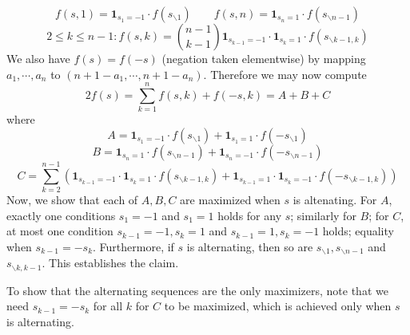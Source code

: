 \documentclass[11pt,a4paper]{article}
\begin{document}
\begin{enumerate}
		$$
		f(s, 1)=\boldsymbol{1}_{s_1=-1}\cdot f(s_{\backslash 1})
		\qquad 
		f(s, n)=\boldsymbol{1}_{s_n=1}\cdot f(s_{\backslash n-1})
		$$
		$$
		2\le k\le n-1: f(s, k) =  \binom{n-1}{k-1}\boldsymbol{1}_{s_{k-1}=-1}\cdot \boldsymbol{1}_{s_{k}=1}\cdot f(s_{\backslash k-1, k})
		$$
		We also have $f(s)=f(-s)$ (negation taken elementwise) by mapping $a_1, \cdots, a_n$ to $(n+1-a_1, \cdots, n+1-a_n)$. Therefore we may now compute
		$$
		2f(s) = \sum_{k=1}^n f(s, k) +f(-s, k)=A+B+C
		$$where
		$$
		A= \boldsymbol{1}_{s_1=-1}\cdot f(s_{\backslash 1}) + \boldsymbol{1}_{s_1=1}\cdot f(-s_{\backslash 1})
		$$$$
		B= \boldsymbol{1}_{s_n=1}\cdot f(s_{\backslash n-1}) + \boldsymbol{1}_{s_n=-1}\cdot f(-s_{\backslash n-1})
		$$$$
		C=\sum_{k=2}^{n-1}\left(\boldsymbol{1}_{s_{k-1}=-1}\cdot \boldsymbol{1}_{s_{k}=1}\cdot f(s_{\backslash k-1, k})
		+ \boldsymbol{1}_{s_{k-1}=1}\cdot \boldsymbol{1}_{s_{k}=-1}\cdot f(-s_{\backslash k-1, k})\right)
		$$
		Now, we show that each of $A, B, C$ are maximized when $s$ is altenating. For $A$, exactly one conditions $s_1=-1$ and $s_1=1$ holds for any $s$;
		similarly for $B$; for $C$, at most one condition $s_{k-1}=-1, s_k=1$ and $s_{k-1}=1, s_{k}=-1$ holds; equality when $s_{k-1}=-s_k$.
		Furthermore, if $s$ is alternating, then so are $s_{\backslash 1}, s_{\backslash n-1}$ and $s_{\backslash k, k-1}$.
		This establishes the claim.
		
		To show that the alternating sequences are the only maximizers, note that we need $s_{k-1}=-s_k$ for all $k$ for $C$ to be maximized, which is achieved only when $s$ is alternating.

    \end{enumerate}
    
\end{document}
